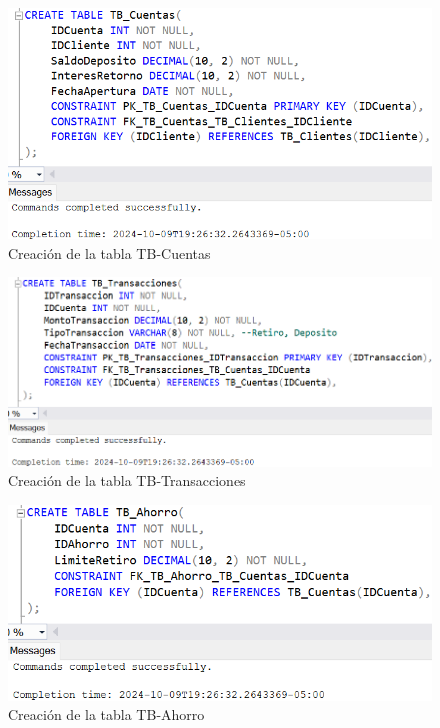 \begin{figure}[H]
  \centering
  \includegraphics[scale = 0.6]{Imagenes/SQL/2.Crear_tablas/crear_tb_cuentas.png}
  \caption{Creación de la tabla TB-Cuentas}
\end{figure}

\begin{figure}[H]
  \centering
  \includegraphics[scale = 0.6]{Imagenes/SQL/2.Crear_tablas/crear_tb_transacciones.png}
  \caption{Creación de la tabla TB-Transacciones}
\end{figure}

\begin{figure}[H]
  \centering
  \includegraphics[scale = 0.6]{Imagenes/SQL/2.Crear_tablas/crear_tb_ahorro.png}
  \caption{Creación de la tabla TB-Ahorro}
\end{figure}

